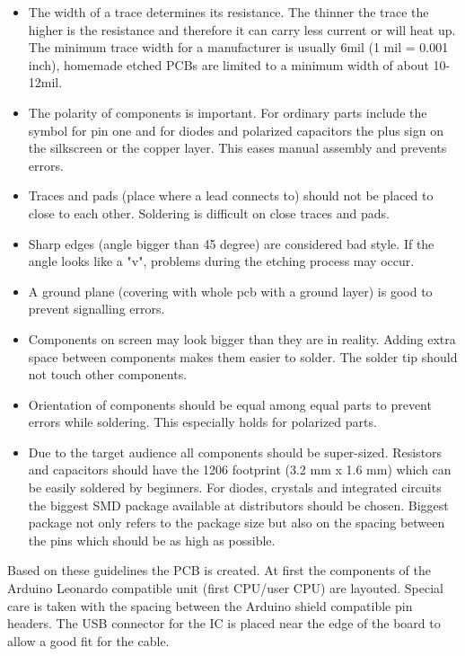 \documentclass[11pt,a4paper]{article}
\begin{document}
\begin{itemize}
\item The width of a trace determines its resistance. The thinner the trace the higher is the resistance and therefore it can carry less current or will heat up. The minimum trace width for a manufacturer is usually 6mil (1 mil = 0.001 inch), homemade etched PCBs are limited to a minimum width of about 10-12mil.
\item The polarity of components is important. For ordinary parts include the symbol for pin one and for diodes and polarized capacitors the plus sign on the silkscreen or the copper layer. This eases manual assembly and prevents errors.
\item Traces and pads (place where a lead connects to) should not be placed to close to each other. Soldering is difficult on close traces and pads. 
\item Sharp edges (angle bigger than 45 degree) are considered bad style. If the angle looks like a "v", problems during the etching process may occur. 
\item A ground plane (covering with whole pcb with a ground layer) is good to prevent signalling errors. 
\item Components on screen may look bigger than they are in reality. Adding extra space between components makes them easier to solder. The solder tip should not touch other components.
\item Orientation of components should be equal among equal parts to prevent errors while soldering. This especially holds for polarized parts.
\item Due to the target audience all components should be super-sized. Resistors and capacitors should have the 1206 footprint (3.2 mm x 1.6 mm) which can be easily soldered by beginners. For diodes, crystals and integrated circuits the biggest SMD package available at distributors should be chosen. Biggest package not only refers to the package size but also on the spacing between the pins which should be as high as possible.
\end{itemize}

Based on these guidelines the PCB is created. At first the components of the Arduino Leonardo compatible unit (first CPU/user CPU) are layouted. Special care is taken with the spacing between the Arduino shield compatible pin headers. The USB connector for the IC is placed near the edge of the board to allow a good fit for the cable.
\end{document}
